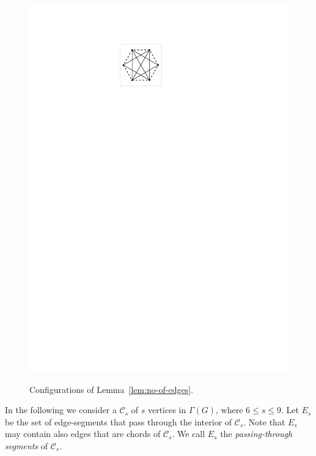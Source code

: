 \begin{figure}[thb]
\begin{minipage}[b]{.18\textwidth}
        \includegraphics[width=\textwidth,page=5]{images/polygon_conf}
        \label{fig:10gon}
    \end{minipage}
    \caption{%
    Configurations of Lemma~\ref{lem:no-of-edges}.}
    \label{fig:replacements}
\end{figure}

In the following we consider a \pp $\mathcal{C}_s$ of $s$ vertices in $\Gamma(G)$, where $6\leq s\leq 9$. Let $E_s$ be the set of edge-segments that pass through the interior of $\mathcal{C}_s$. Note that $E_s$ may contain also edges that are chords of $\mathcal{C}_s$. We call $E_s$ the \emph{passing-through segments} of $\mathcal{C}_s$. 

